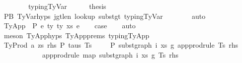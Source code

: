 \begin{isabellebody}
\ \ \ \ \ \ \ \ typing{\isachardot}{\kern0pt}TyVar{\isacharparenright}{\kern0pt}\isanewline
\isanewline
\ \ \ \ \isamarkupfalse%
\ {\isacharquery}{\kern0pt}thesis\isanewline
\ \ \ \ \ \ \isamarkupfalse%
\ P{}B\ TyVar{\isachardot}{\kern0pt}hyps{\isacharparenleft}{\kern0pt}{}{\isacharcomma}{\kern0pt}{}{\isacharcomma}{\kern0pt}{}{\isacharcomma}{\kern0pt}{}{\isacharcomma}{\kern0pt}{}{\isacharparenright}{\kern0pt}\ j{\isacharunderscore}{\kern0pt}gt{\isacharunderscore}{\kern0pt}len{\isacharunderscore}{\kern0pt}{\isasymGamma}{}\ lookup{}\ subst{\isacharunderscore}{\kern0pt}gt\ typing{\isachardot}{\kern0pt}TyVar\isanewline
\ \ \ \ \ \ \isamarkupfalse%
\ auto\isanewline
\ \ \isamarkupfalse%
\isanewline
{}\isamarkupfalse%
\isanewline
\ \ \isamarkupfalse%
\ {\isacharparenleft}{\kern0pt}TyApp\ {\isasymGamma}\ P\ e{}\ ty{}\ ty{}\ xs\ e{}{\isacharparenright}{\kern0pt}\isanewline
\ \ \isamarkupfalse%
\ {\isacharquery}{\kern0pt}case\isanewline
\ \ \isamarkupfalse%
\ auto\isanewline
\ \ \isamarkupfalse%
\ {\isacharparenleft}{\kern0pt}meson\ TyApp{\isachardot}{\kern0pt}hyps{\isacharparenleft}{\kern0pt}{}{\isacharcomma}{\kern0pt}{}{\isacharparenright}{\kern0pt}\ TyApp{\isachardot}{\kern0pt}prems{\isacharparenleft}{\kern0pt}{}{\isacharcomma}{\kern0pt}{}{\isacharcomma}{\kern0pt}{}{\isacharcomma}{\kern0pt}{}{\isacharcomma}{\kern0pt}{}{\isacharparenright}{\kern0pt}\ typing{\isachardot}{\kern0pt}TyApp{\isacharparenright}{\kern0pt}\isanewline
\isanewline
{}\isamarkupfalse%
\isanewline
\ \ \isamarkupfalse%
\ {\isacharparenleft}{\kern0pt}TyProd\ a\ zs\ rhs\ P\ taus\ Ts\ {\isasymGamma}{\isacharparenright}{\kern0pt}\isanewline
\ \ \isamarkupfalse%
\ P{}{\isacharcolon}{\kern0pt}\ {\isachardoublequoteopen}subst{\isacharunderscore}{\kern0pt}graph\ i\ xs\ g{}\ {\isacharparenleft}{\kern0pt}app{\isacharunderscore}{\kern0pt}prodrule\ Ts\ rhs{\isacharparenright}{\kern0pt}\ {\isacharequal}{\kern0pt}\isanewline
\ \ \ \ \ \ \ \ \ \ \ \ app{\isacharunderscore}{\kern0pt}prodrule\ {\isacharparenleft}{\kern0pt}map\ {\isacharparenleft}{\kern0pt}subst{\isacharunderscore}{\kern0pt}graph\ i\ xs\ g{}{\isacharparenright}{\kern0pt}\ Ts{\isacharparenright}{\kern0pt}\ rhs{\isachardoublequoteclose}\isanewline

\end{isabellebody}
